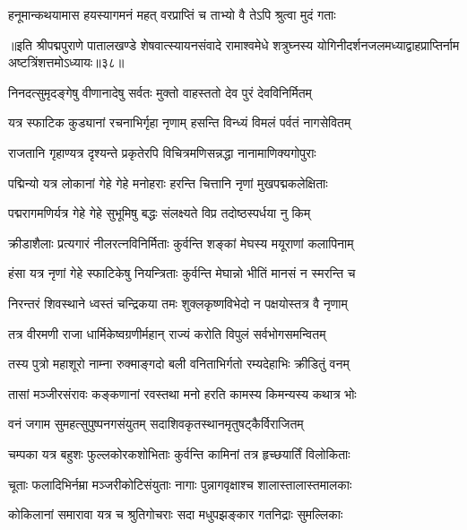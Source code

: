 \twolineshloka
{हनूमान्कथयामास हयस्यागमनं महत्}
{वरप्राप्तिं च ताभ्यो वै तेऽपि श्रुत्वा मुदं गताः}%

{॥इति श्रीपद्मपुराणे पातालखण्डे शेषवात्स्यायनसंवादे रामाश्वमेधे शत्रुघ्नस्य योगिनीदर्शनजलमध्याद्वाहप्राप्तिर्नाम अष्टत्रिंशत्तमोऽध्यायः॥३८॥}



\twolineshloka
{निनदत्सुमृदङ्गेषु वीणानादेषु सर्वतः}
{मुक्तो वाहस्ततो देव पुरं देवविनिर्मितम्}%

\twolineshloka
{यत्र स्फाटिक कुड्यानां रचनाभिर्गृहा नृणाम्}
{हसन्ति विन्ध्यं विमलं पर्वतं नागसेवितम्}%

\twolineshloka
{राजतानि गृहाण्यत्र दृश्यन्ते प्रकृतेरपि}
{विचित्रमणिसन्नद्धा नानामाणिक्यगोपुराः}%

\twolineshloka
{पद्मिन्यो यत्र लोकानां गेहे गेहे मनोहराः}
{हरन्ति चित्तानि नृणां मुखपद्मकलेक्षिताः}%

\twolineshloka
{पद्मरागमणिर्यत्र गेहे गेहे सुभूमिषु}
{बद्धः संलक्ष्यते विप्र तदोष्ठस्पर्धया नु किम्}%

\twolineshloka
{क्रीडाशैलाः प्रत्यगारं नीलरत्नविनिर्मिताः}
{कुर्वन्ति शङ्कां मेघस्य मयूराणां कलापिनाम्}%

\twolineshloka
{हंसा यत्र नृणां गेहे स्फाटिकेषु नियन्त्रिताः}
{कुर्वन्ति मेघान्नो भीतिं मानसं न स्मरन्ति च}%

\twolineshloka
{निरन्तरं शिवस्थाने ध्वस्तं चन्द्रिकया तमः}
{शुक्लकृष्णविभेदो न पक्षयोस्तत्र वै नृणाम्}%

\twolineshloka
{तत्र वीरमणी राजा धार्मिकेष्वग्रणीर्महान्}
{राज्यं करोति विपुलं सर्वभोगसमन्वितम्}%

\twolineshloka
{तस्य पुत्रो महाशूरो नाम्ना रुक्माङ्गदो बली}
{वनिताभिर्गतो रम्यदेहाभिः क्रीडितुं वनम्}%

\twolineshloka
{तासां मञ्जीरसंरावः कङ्कणानां रवस्तथा}
{मनो हरति कामस्य किमन्यस्य कथात्र भोः}%

\twolineshloka
{वनं जगाम सुमहत्सुपुष्पनगसंयुतम्}
{सदाशिवकृतस्थानमृतुषट्कैर्विराजितम्}%

\twolineshloka
{चम्पका यत्र बहुशः फुल्लकोरकशोभिताः}
{कुर्वन्ति कामिनां तत्र हृच्छयार्तिं विलोकिताः}%

\twolineshloka
{चूताः फलादिभिर्नम्रा मञ्जरीकोटिसंयुताः}
{नागाः पुन्नागवृक्षाश्च शालास्तालास्तमालकाः}%

\twolineshloka
{कोकिलानां समारावा यत्र च श्रुतिगोचराः}
{सदा मधुपझङ्कार गतनिद्राः सुमल्लिकाः}%

